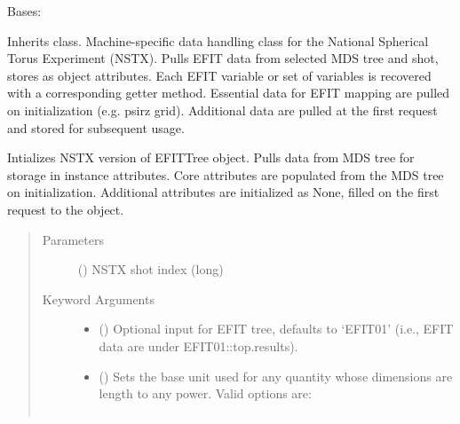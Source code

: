 \documentclass[letterpaper,10pt,english]{sphinxmanual}
\begin{document}
\begin{fulllineitems}
\label{\detokenize{eqtools:eqtools.NSTXEFIT.NSTXEFITTree}}
Bases: {\hyperref[\detokenize{eqtools:eqtools.EFIT.EFITTree}]{}}

Inherits  class. Machine-specific data
handling class for the National Spherical Torus Experiment (NSTX). Pulls EFIT
data from selected MDS tree and shot, stores as object attributes. Each EFIT
variable or set of variables is recovered with a corresponding getter method.
Essential data for EFIT mapping are pulled on initialization (e.g. psirz grid).
Additional data are pulled at the first request and stored for subsequent usage.

Intializes NSTX version of EFITTree object.  Pulls data from MDS tree for storage
in instance attributes.  Core attributes are populated from the MDS tree on initialization.
Additional attributes are initialized as None, filled on the first request to the object.
\begin{quote}\begin{description}
\item[{Parameters}] \leavevmode
{} () \textendash{} NSTX shot index (long)

\item[{Keyword Arguments}] \leavevmode\begin{itemize}
\item {} 
 () \textendash{} Optional input for EFIT tree, defaults to ‘EFIT01’
(i.e., EFIT data are under EFIT01::top.results).

\item {} 
 () \textendash{} 
Sets the base unit used for any quantity whose
dimensions are length to any power. Valid options are:
\begin{quote}


\begin{savenotes}\sphinxattablestart
\centering
\begin{tabulary}{\linewidth}[t]{|T|T|}
\hline


\end{tabulary}
\end{savenotes}
\end{quote}
\end{itemize}
\end{description}
\end{quote}
\end{fulllineitems}
\end{document}
